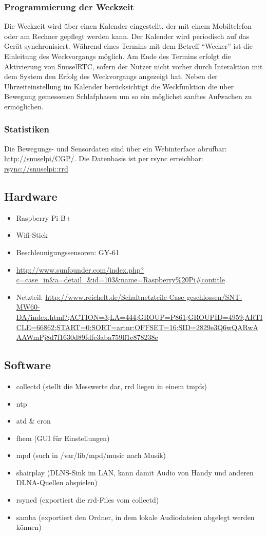 \documentclass[a4paper,twoside,titlepage,normalheadings,tocleft,bibtotoc]{scrartcl}
\begin{document}
\subsubsection{Programmierung der Weckzeit}
Die Weckzeit wird über einen Kalender eingestellt, der mit einem Mobiltelefon oder am Rechner gepflegt werden kann. Der Kalender wird periodisch auf das Gerät synchronisiert. Während eines Termins mit dem Betreff "`Wecker"' ist die Einleitung des Weckvorgangs möglich. Am Ende des Termins erfolgt die Aktivierung von SnuselRTC, sofern der Nutzer nicht vorher durch Interaktion mit dem System den Erfolg des Weckvorgangs angezeigt hat. Neben der Uhrzeiteinstellung im Kalender berücksichtigt die Weckfunktion die über Bewegung gemessenen Schlafphasen um so ein möglichst sanftes Aufwachen zu ermöglichen. 

\subsubsection{Statistiken}
Die Bewegungs- und Sensordaten sind über ein Webinterface abrufbar: \url{http://snuselpi/CGP/}.
Die Datenbasis ist per rsync erreichbar: \url{rsync://snuselpi::rrd}

\subsection{Hardware}
\begin{itemize}
\item Raspberry Pi B+
\item Wifi-Stick
\item Beschleunigungssensoren:  GY-61
\item \url{http://www.sunfounder.com/index.php?c=case_in&a=detail_&id=103&name=Raspberry%20Pi#contitle}
\item Netzteil: \url{http://www.reichelt.de/Schaltnetzteile-Case-geschlossen/SNT-MW60-DA/index.html?;ACTION=3;LA=444;GROUP=P861;GROUPID=4959;ARTICLE=66862;START=0;SORT=artnr;OFFSET=16;SID=2829e3Q6wQARwAAAWmPj8d7f1630d89fdfc3aba759ff1c878238e}
\end{itemize}

\subsection{Software}
\begin{itemize}
\item collectd (stellt die Messwerte dar, rrd liegen in einem tmpfs)
\item ntp
\item atd \& cron
\item fhem (GUI für Einstellungen)
\item mpd (such in /var/lib/mpd/music nach Musik)
\item shairplay (DLNS-Sink im LAN, kann damit Audio von Handy und anderen DLNA-Quellen abspielen)
\item rsyncd (exportiert die rrd-Files vom collectd)
\item samba (exportiert den Ordner, in dem lokale Audiodateien abgelegt werden können)
\end{itemize}
\end{document}
